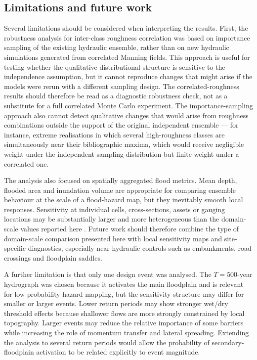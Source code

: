 \documentclass[a4paper,fleqn]{cas-sc}
\begin{document}
\subsection{Limitations and future work}
\label{sec:limitations}
Several limitations should be considered when interpreting the results. First, the robustness analysis for inter-class roughness correlation was based on importance sampling of the existing hydraulic ensemble, rather than on new hydraulic simulations generated from correlated Manning fields. This approach is useful for testing whether the qualitative distributional structure is sensitive to the independence assumption, but it cannot reproduce changes that might arise if the models were rerun with a different sampling design. The correlated-roughness results should therefore be read as a diagnostic robustness check, not as a substitute for a full correlated Monte Carlo experiment. The importance-sampling approach also cannot detect qualitative changes that would arise from roughness combinations outside the support of the original independent ensemble --- for instance, extreme realisations in which several high-roughness classes are simultaneously near their bibliographic maxima, which would receive negligible weight under the independent sampling distribution but finite weight under a correlated one.

The analysis also focused on spatially aggregated flood metrics. Mean depth, flooded area and inundation volume are appropriate for comparing ensemble behaviour at the scale of a flood-hazard map, but they inevitably smooth local responses. Sensitivity at individual cells, cross-sections, assets or gauging locations may be substantially larger and more heterogeneous than the domain-scale values reported here \citep{pappenberger2005,cook2009}. Future work should therefore combine the type of domain-scale comparison presented here with local sensitivity maps and site-specific diagnostics, especially near hydraulic controls such as embankments, road crossings and floodplain saddles.

A further limitation is that only one design event was analysed. The $T=500$-year hydrograph was chosen because it activates the main floodplain and is relevant for low-probability hazard mapping, but the sensitivity structure may differ for smaller or larger events. Lower return periods may show stronger wet/dry threshold effects because shallower flows are more strongly constrained by local topography. Larger events may reduce the relative importance of some barriers while increasing the role of momentum transfer and lateral spreading. Extending the analysis to several return periods would allow the probability of secondary-floodplain activation to be related explicitly to event magnitude.
\end{document}

